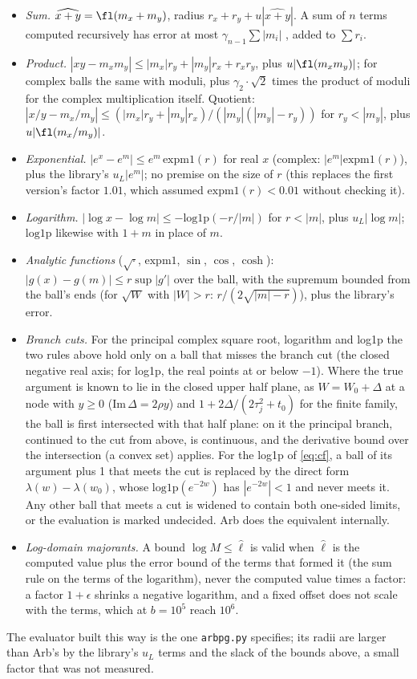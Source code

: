 \begin{itemize}
\item \emph{Sum.} $\widehat{x+y}=\fl(m_x+m_y)$, radius $r_x+r_y+u|\widehat{x+y}|$. A sum of $n$ terms computed
recursively has error at most $\gamma_{n-1}\sum|m_i|$ \cite[Sec.~4.2]{higham}, added to $\sum r_i$.
\item \emph{Product.} $|xy-m_xm_y|\le|m_x|r_y+|m_y|r_x+r_xr_y$, plus $u|\fl(m_xm_y)|$; for complex balls the same with
moduli, plus $\gamma_2\cdot\sqrt2$ times the product of moduli for the complex multiplication itself. Quotient:
$|x/y-m_x/m_y|\le(|m_x|r_y+|m_y|r_x)/(|m_y|(|m_y|-r_y))$ for $r_y<|m_y|$, plus $u|\fl(m_x/m_y)|$.
\item \emph{Exponential.} $|e^x-e^{m}|\le e^{m}\,\mathrm{expm1}(r)$ for real $x$ (complex: $|e^{m}|\mathrm{expm1}(r)$),
plus the library's $u_L|e^m|$; no premise on the size of $r$ (this replaces the first version's factor $1.01$,
which assumed $\mathrm{expm1}(r)<0.01$ without checking it).
\item \emph{Logarithm.} $|\log x-\log m|\le-\mathrm{log1p}(-r/|m|)$ for $r<|m|$, plus $u_L|\log m|$;
$\mathrm{log1p}$ likewise with $1+m$ in place of $m$.
\item \emph{Analytic functions} ($\sqrt{\cdot}$, $\mathrm{expm1}$, $\sin$, $\cos$, $\cosh$): $|g(x)-g(m)|\le r\sup|g'|$
over the ball, with the supremum bounded from the ball's ends (for $\sqrt W$ with $|W|>r$:
$r/(2\sqrt{|m|-r})$), plus the library's error.
\item \emph{Branch cuts.} For the principal complex square root, logarithm and log1p the two rules above hold only
on a ball that misses the branch cut (the closed negative real axis; for log1p, the real points at or below $-1$).
Where the true argument is known to lie in the closed upper half plane, as $W=W_0+\Delta$ at a node with $y\ge0$
($\mathrm{Im}\,\Delta=2\rho y$) and $1+2\Delta/(2\tau_j^2+t_0)$ for the finite family, the ball is first intersected
with that half plane: on it the principal branch, continued to the cut from above, is continuous, and the
derivative bound over the intersection (a convex set) applies. For the log1p of \eqref{eq:cf}, a ball of its
argument plus 1 that meets the cut is replaced by the direct form $\lambda(w)-\lambda(w_0)$, whose
$\mathrm{log1p}(e^{-2w})$ has $|e^{-2w}|<1$ and never meets it. Any other ball that meets a cut is widened to contain
both one-sided limits, or the evaluation is marked undecided. Arb does the equivalent internally.
\item \emph{Log-domain majorants.} A bound $\log M\le\hat\ell$ is valid when $\hat\ell$ is the computed value plus the
error bound of the terms that formed it (the sum rule on the terms of the logarithm), never the computed value
times a factor: a factor $1+\epsilon$ shrinks a negative logarithm, and a fixed offset does not scale with the
terms, which at $b=10^5$ reach $10^6$.
\end{itemize}
The evaluator built this way is the one \texttt{arbpg.py} specifies; its radii are larger than Arb's by the
library's $u_L$ terms and the slack of the bounds above, a small factor that was not measured.

